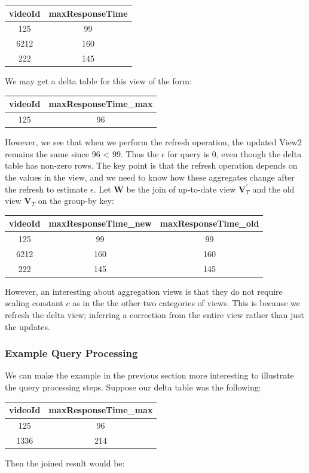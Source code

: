 \begin{tabular}{|c|c|}
\hline 
videoId & maxResponseTime\tabularnewline
\hline 
\hline 
125 & 99\tabularnewline
\hline 
6212 & 160\tabularnewline
\hline 
222 & 145\tabularnewline
\hline 
\end{tabular}

We may get a delta table for this view of the form:

\begin{tabular}{|c|c|}
\hline 
videoId & maxResponseTime\_max\tabularnewline
\hline 
\hline 
125 & 96\tabularnewline
\hline 
\end{tabular}

However, we see that when we perform the refresh operation, the updated
View2 remains the same since 96 < 99. 
Thus the $\epsilon$ for query is 0, even though the delta table has non-zero rows. 
The key point is that the refresh operation depends on the values in the view, 
and we need to know how these aggregates change
after the refresh to estimate $\epsilon$. 
Let $\textbf{W}$ be the join of up-to-date view $\textbf{V}_{T}^{'}$ and the old view $\textbf{V}_{T}$
on the group-by key:

\begin{tabular}{|c|c|c|}
\hline 
videoId & maxResponseTime\_new & maxResponseTime\_old \tabularnewline
\hline 
\hline 
125 & 99 & 99\tabularnewline
\hline 
6212 & 160 & 160\tabularnewline
\hline 
222 & 145 & 145\tabularnewline
\hline 
\end{tabular}

However, an interesting about aggregation views is that they do not 
require scaling constant $c$ as in the the other two categories of views.
This is because we refresh the delta view; inferring a correction from the
entire view rather than just the updates.

\subsubsection{Example Query Processing}
We can make the example in the previous section more interesting to illustrate the query processing steps.
Suppose our delta table was the following:

\begin{tabular}{|c|c|}
\hline 
videoId & maxResponseTime\_max\tabularnewline
\hline 
\hline 
125 & 96\tabularnewline
\hline 
1336 & 214\tabularnewline
\hline 
\end{tabular}

Then the joined result would be:

